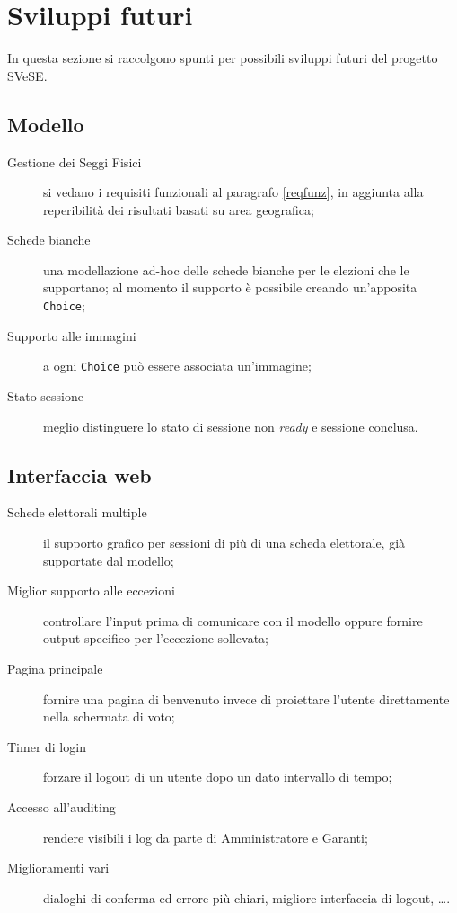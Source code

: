 \section{Sviluppi futuri}
In questa sezione si raccolgono spunti per possibili sviluppi futuri del progetto SVeSE.


\subsection{Modello}
\begin{description}
	\item[Gestione dei Seggi Fisici] si vedano i requisiti funzionali al paragrafo \ref{reqfunz}, in aggiunta alla reperibilità dei risultati basati su area geografica;
	\item[Schede bianche] una modellazione ad-hoc delle schede bianche per le elezioni che le supportano; al momento il supporto è possibile creando un'apposita \verb!Choice!;
	\item[Supporto alle immagini] a ogni \verb!Choice! può essere associata un'immagine;
	\item[Stato sessione] meglio distinguere lo stato di sessione non \emph{ready} e sessione conclusa.
\end{description}


\subsection{Interfaccia web}
\begin{description}
	\item[Schede elettorali multiple] il supporto grafico per sessioni di più di una scheda elettorale, già supportate dal modello;
	\item[Miglior supporto alle eccezioni] controllare l'input prima di comunicare con il modello oppure fornire output specifico per l'eccezione sollevata;
	\item[Pagina principale] fornire una pagina di benvenuto invece di proiettare l'utente direttamente nella schermata di voto;
	\item[Timer di login] forzare il logout di un utente dopo un dato intervallo di tempo;
	\item[Accesso all'auditing] rendere visibili i log da parte di Amministratore e Garanti;
	\item[Miglioramenti vari] dialoghi di conferma ed errore più chiari, migliore interfaccia di logout, \dots.
\end{description}


